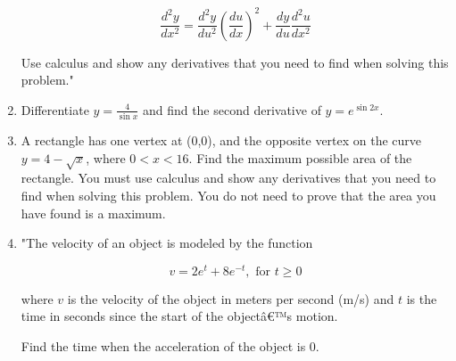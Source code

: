 \documentclass{article}
\begin{document}
\begin{enumerate}
\[
\frac{d^2 y}{dx^2} = \frac{d^2 y}{du^2} \left( \frac{du}{dx} \right)^2 + \frac{dy}{du} \frac{d^2 u}{dx^2}
\]

Use calculus and show any derivatives that you need to find when solving this problem."
\vspace{3cm}
\item Differentiate \( y = \frac{4}{\sin x} \) and find the second derivative of \( y = e^{\sin 2x} \).
\vspace{3cm}
\item A rectangle has one vertex at (0,0), and the opposite vertex on the curve \( y = 4 - \sqrt{x} \), where \( 0 < x < 16 \). Find the maximum possible area of the rectangle. You must use calculus and show any derivatives that you need to find when solving this problem. You do not need to prove that the area you have found is a maximum.
\vspace{3cm}
\item "The velocity of an object is modeled by the function

\[ v = 2e^t + 8e^{-t}, \text{ for } t \geq 0 \]

where \( v \) is the velocity of the object in meters per second (m/s) and \( t \) is the time in seconds since the start of the objectâ€™s motion.

Find the time when the acceleration of the object is 0.


\end{enumerate}
\end{document}
